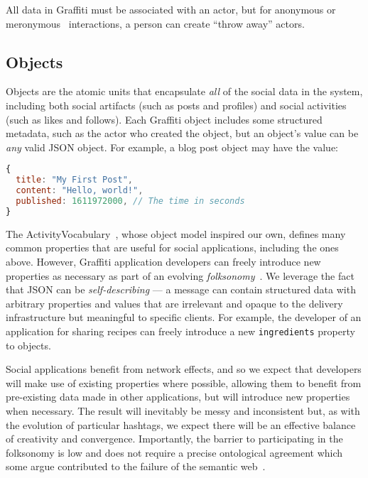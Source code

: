 All data in Graffiti must be associated with an actor, but
for anonymous or meronymous~\cite{meronymous} interactions,
a person can create ``throw away'' actors.

\subsection{Objects}
\label{concepts:objects}

Objects are the atomic units that encapsulate \emph{all}
of the social data in the system, including
both social artifacts (such as posts and profiles) and social activities (such as likes and follows).
Each Graffiti object includes some structured metadata,
such as the actor who created the object,
but an object's value can be \emph{any} valid JSON object.
For example, a blog post object may have the value:

\begin{lstlisting}[language=javascript]
{
  title: "My First Post",
  content: "Hello, world!",
  published: 1611972000, // The time in seconds
}
\end{lstlisting}

The ActivityVocabulary~\cite{activityvocab},
whose object model inspired our own,
defines many common properties that are useful for social applications, including
the ones above.
However, Graffiti application developers can freely introduce new properties as necessary
as part of an evolving \emph{folksonomy}~\cite{folksonomy}.
We leverage the fact that JSON can be \emph{self-describing}
--- a message can contain structured data with arbitrary properties and
values that are irrelevant and opaque to the delivery infrastructure but
meaningful to specific clients.
For example, the developer of an application for sharing recipes can freely introduce a new
\texttt{ingredients} property to objects.

Social applications
benefit from network effects, and so we expect that developers will make use of
existing properties where possible, allowing them to benefit from pre-existing data
made in other applications, but will introduce new properties when necessary.
The result will inevitably be messy and inconsistent but, as with the evolution of
particular hashtags, we expect there will be an effective balance of creativity and convergence.
Importantly, the barrier to participating in the folksonomy is low
and does not require a precise ontological agreement
which some argue contributed to the failure of the semantic web~\cite{semanticwebtwodecades}.

